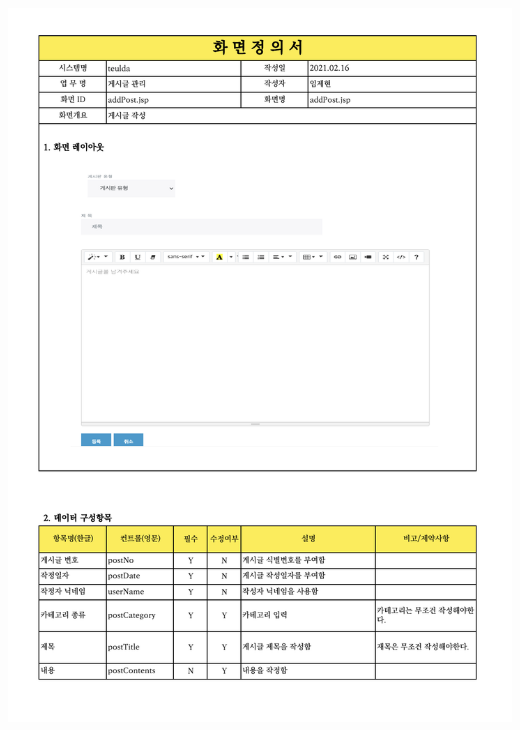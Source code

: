 {{{{{{{{{{{{{{{{{{{{{{{{{{{{{{{{{{{{{{{{{{{{{{{{{{{{{{{{{{{\includegraphics[width=19cm]{./Figure/Design/Display/post/post_07.pdf} \\
}}}}}}}}}}}}}}}}}}}}}}}}}}}}}}}}}}}}}}}}}}}}}}}}}}}}}}}}}}}
